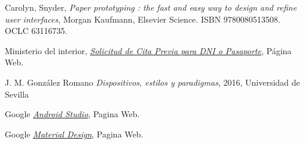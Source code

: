 \documentclass[a4paper,11pt]{article}
\begin{document}
\begin{thebibliography}{99}
Carolyn, Snyder,
\textit{Paper prototyping : the fast and easy way to design and refine user interfaces},
 Morgan Kaufmann, Elsevier Science. ISBN 9780080513508. OCLC 63116735.


Ministerio del interior,
\href{https://www.citapreviadnie.es/citaPreviaDniExp/}{\textit{Solicitud de Cita Previa para DNI o Pasaporte}}, Página Web.


J. M. González Romano
\textit{Dispositivos, estilos y paradigmas}, 2016, Universidad de Sevilla

Google
\href{https://developer.android.com/studio/}{\textit{Android Studio}}, Pagina Web.

Google
\href{https://material.io/}{\textit{Material Design}}, Pagina Web.



\end{thebibliography}
\end{document}
